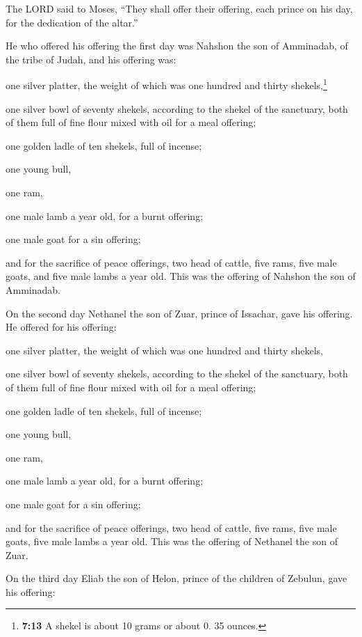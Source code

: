  The LORD said to Moses, ``They shall offer their
offering, each prince on his day, for the dedication of the altar.''

 He who offered his offering the first day was Nahshon
the son of Amminadab, of the tribe of Judah,  and his
offering was:

one silver platter, the weight of which was one hundred and thirty
shekels,\footnote{\textbf{7:13} A shekel is about 10 grams or about 0.
  35 ounces.}

one silver bowl of seventy shekels, according to the shekel of the
sanctuary, both of them full of fine flour mixed with oil for a meal
offering;

 one golden ladle of ten shekels, full of incense;

 one young bull,

one ram,

one male lamb a year old, for a burnt offering;

 one male goat for a sin offering;

 and for the sacrifice of peace offerings, two head of
cattle, five rams, five male goats, and five male lambs a year old. This
was the offering of Nahshon the son of Amminadab.

 On the second day Nethanel the son of Zuar, prince of
Issachar, gave his offering.  He offered for his
offering:

one silver platter, the weight of which was one hundred and thirty
shekels,

one silver bowl of seventy shekels, according to the shekel of the
sanctuary, both of them full of fine flour mixed with oil for a meal
offering;

 one golden ladle of ten shekels, full of incense;

 one young bull,

one ram,

one male lamb a year old, for a burnt offering;

 one male goat for a sin offering;

 and for the sacrifice of peace offerings, two head of
cattle, five rams, five male goats, five male lambs a year old. This was
the offering of Nethanel the son of Zuar.

 On the third day Eliab the son of Helon, prince of the
children of Zebulun,  gave his offering:

